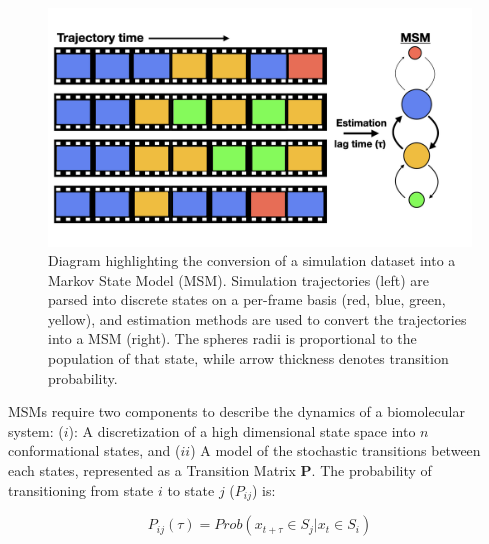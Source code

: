 \documentclass[../main.tex]{subfiles}
\begin{document}
        \begin{figure}[!htb] %
            \centering
            \includegraphics[width=\linewidth]{ch1-fig2.jpeg}
            \caption[Scheme highlighting the conversion of a simulation dataset into a Markov State Model (MSM)]
                {Diagram highlighting the conversion of a simulation dataset into a Markov State Model (MSM). Simulation trajectories (left) are parsed into discrete states on a per-frame basis (red, blue, green, yellow), and estimation methods are used to convert the trajectories into a MSM (right). The spheres radii is proportional to the population of that state, while arrow thickness denotes transition probability.}
            \label{fig:ch1-fig2}
        \end{figure}

		MSMs require two components to describe the dynamics of a biomolecular system: ($i$): A discretization of a high dimensional state space into $n$ conformational states, and ($ii$) A model of the stochastic transitions between each states, represented as a Transition Matrix $\textbf{P}$. The probability of transitioning from state $i$ to state $j$  ($P_{ij}$) is: 

        \begin{equation}\label{transition-matrix-eq}
            P_{ij}(\tau)=Prob(x_{t+\tau}\in S_j | x_t \in S_i)
        \end{equation} 
\end{document}
